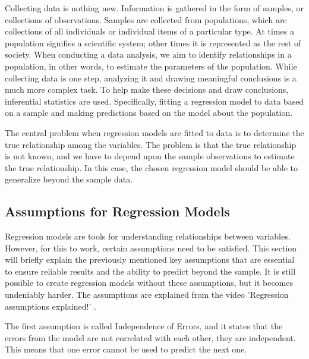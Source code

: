 Collecting data is nothing new. Information is gathered in the form of samples, or collections of observations. Samples are collected from populations, which are collections of all individuals or individual items of a particular type. At times a population signifies a scientific system; other times it is represented as the rest of society. When conducting a data analysis, we aim to identify relationships in a population, in other words, to estimate the parameters of the population. While collecting data is one step, analyzing it and drawing meaningful conclusions is a much more complex task. To help make these decisions and draw conclusions, inferential statistics are used.  Specifically, fitting a regression model to data based on a sample and making predictions based on the model about the population. \cite{ProbAndStat} \newline


\noindent The central problem when regression models are fitted to data is to determine the true relationship among the variables. The problem is that the true relationship is not known, and we have to depend upon the sample observations to estimate the true relationship. In this case, the chosen regression model should be able to generalize beyond the sample data. \newline 



\subsection{Assumptions for Regression Models}

\noindent Regression models are tools for understanding relationships between variables. However, for this to work, certain assumptions need to be satisfied. This section will briefly explain the previously mentioned key assumptions that are essential to ensure reliable results and the ability to predict beyond the sample. It is still possible to create regression models without these assumptions, but it becomes undeniably harder. The assumptions are explained from the video 'Regression assumptions explained!' \cite{Assumptions}.  \newline

\noindent The first assumption is called Independence of Errors, and it states that the errors from the model are not correlated with each other, they are independent. This means that one error cannot be used to predict the next one. \newline


